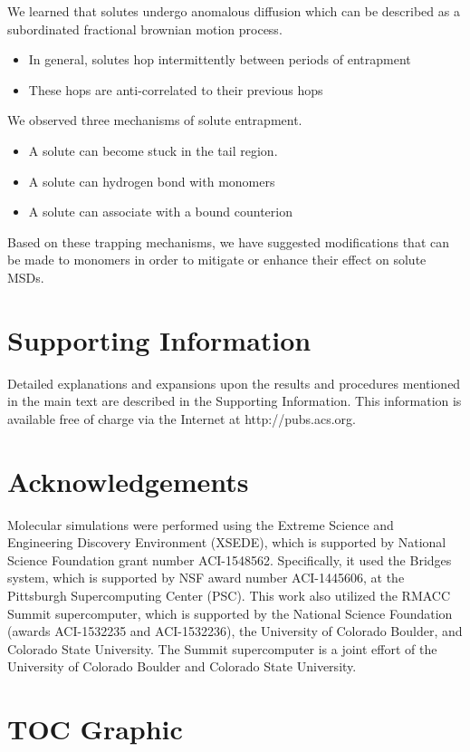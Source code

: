 \documentclass{article}
\begin{document}
  We learned that solutes undergo anomalous diffusion which can be described 
  as a subordinated fractional brownian motion process. 
  \begin{itemize}
    \item In general, solutes hop intermittently between periods of entrapment
    \item These hops are anti-correlated to their previous hops
  \end{itemize}
  
  We observed three mechanisms of solute entrapment.
  \begin{itemize}
    \item A solute can become stuck in the tail region. 
    \item A solute can hydrogen bond with monomers
    \item A solute can associate with a bound counterion
  \end{itemize}
  
  Based on these trapping mechanisms, we have suggested modifications that
  can be made to monomers in order to mitigate or enhance their effect on
  solute MSDs.
 
  \section*{Supporting Information}

  Detailed explanations and expansions upon the results and procedures mentioned in
  the main text are described in the Supporting Information. This information is
  available free of charge via the Internet at http://pubs.acs.org.

  \section*{Acknowledgements}

  Molecular simulations were performed using the Extreme Science and
  Engineering Discovery Environment (XSEDE), which is supported by National
  Science Foundation grant number ACI-1548562. Specifically, it used the Bridges
  system, which is supported by NSF award number ACI-1445606, at the Pittsburgh
  Supercomputing Center (PSC). This work also utilized the RMACC Summit supercomputer,
  which is supported by the National Science Foundation (awards ACI-1532235 and
  ACI-1532236), the University of Colorado Boulder, and Colorado State
  University. The Summit supercomputer is a joint effort of the University of
  Colorado Boulder and Colorado State University.

  \clearpage

  
  

  \newpage

  \section*{TOC Graphic}
\end{document}

